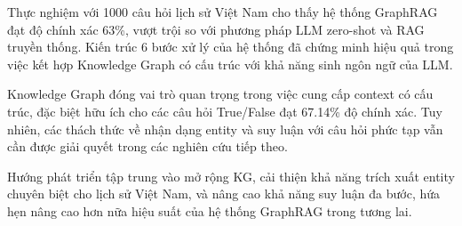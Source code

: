 Thực nghiệm với 1000 câu hỏi lịch sử Việt Nam cho thấy hệ thống GraphRAG đạt độ chính xác 63\%, vượt trội so với phương pháp LLM zero-shot và RAG truyền thống. Kiến trúc 6 bước xử lý của hệ thống đã chứng minh hiệu quả trong việc kết hợp Knowledge Graph có cấu trúc với khả năng sinh ngôn ngữ của LLM.

Knowledge Graph đóng vai trò quan trọng trong việc cung cấp context có cấu trúc, đặc biệt hữu ích cho các câu hỏi True/False đạt 67.14\% độ chính xác. Tuy nhiên, các thách thức về nhận dạng entity và suy luận với câu hỏi phức tạp vẫn cần được giải quyết trong các nghiên cứu tiếp theo.

Hướng phát triển tập trung vào mở rộng KG, cải thiện khả năng trích xuất entity chuyên biệt cho lịch sử Việt Nam, và nâng cao khả năng suy luận đa bước, hứa hẹn nâng cao hơn nữa hiệu suất của hệ thống GraphRAG trong tương lai.